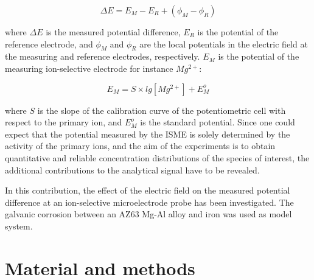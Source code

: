 \documentclass[3p]{elsarticle}
\begin{document}
\begin{equation}
\Delta E=E_M-E_R + (\phi_M - \phi_R)
\label{eq:potential}
\end{equation}

where $\Delta E$ is the measured potential difference, $E_R$ is the potential of the reference electrode, and $\phi_M$ and $\phi_R$ are the local potentials in the electric field at the measuring and reference electrodes, respectively. $E_M$ is the potential of the measuring ion-selective electrode for instance $Mg^{2+}$:

\begin{equation}
E_M = S \times lg[Mg^{2+}] + E_M^o
\label{eq:measuring}
\end{equation}

where $S$ is the slope of the calibration curve of the potentiometric cell with respect to the primary ion, and $E_M^o$ is the standard potential.
Since one could expect that the potential measured by the ISME is solely determined by the activity of the primary ions, and the aim of the experiments is to obtain quantitative and reliable concentration distributions of the species of interest, the additional contributions to the analytical signal have to be revealed.

In this contribution, the effect of the electric field on the measured potential difference at an ion-selective microelectrode probe has been investigated. The galvanic corrosion between an AZ63 Mg-Al alloy and iron was used as model system.

\section{Material and methods}
\end{document}

